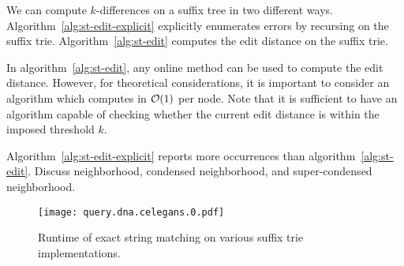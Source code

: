 We can compute $k$-differences on a suffix tree in two different ways. Algorithm~\ref{alg:st-edit-explicit} explicitly enumerates errors by recursing on the suffix trie. Algorithm~\ref{alg:st-edit} computes the edit distance on the suffix trie.

%

In algorithm~\ref{alg:st-edit}, any online method can be used to compute the edit distance.
However, for theoretical considerations, it is important to consider an algorithm which computes in $\mathcal{O}(1)$ per node.
Note that it is sufficient to have an algorithm capable of checking whether the current edit distance is within the imposed threshold $k$.

Algorithm~\ref{alg:st-edit-explicit} reports more occurrences than algorithm~\ref{alg:st-edit}.
Discuss neighborhood, condensed neighborhood, and super-condensed neighborhood.


\begin{figure}[h]
\begin{center}
\caption[Exact string matching runtime]{Runtime of exact string matching on various suffix trie implementations.}
\label{fig:query-dna-exact}
\texttt{[image: query.dna.celegans.0.pdf]}
\end{center}
\end{figure}

